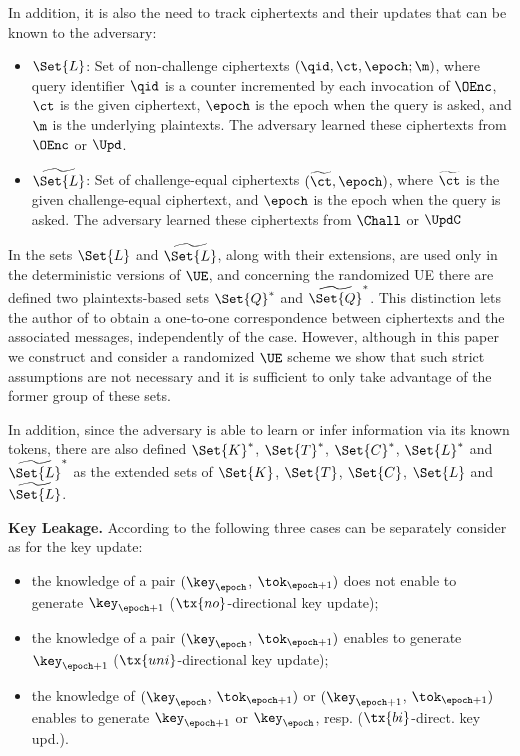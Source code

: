 \documentclass{fundam}
\begin{document}
In addition, it is also the need to track ciphertexts and their updates that can be known to the adversary:
\begin{itemize}
\item $\Set{L}$: Set of non-challenge ciphertexts $(\qid, \ct, \epoch ; \m)$, where query identifier $\qid$ is a counter incremented by each invocation of $\OEnc$, $\ct$ is the given ciphertext, $\epoch$ is the epoch when the query is asked, and $\m$ is the underlying plaintexts. The adversary learned these ciphertexts from $\OEnc$ or $\Upd$.
\item $\widetilde{\Set{L}}$: Set of challenge-equal ciphertexts $(\widetilde{\ct}, \epoch)$, where $\widetilde{\ct}$ is the given challenge-equal ciphertext, and $\epoch$ is the epoch when the query is asked. The adversary learned these ciphertexts from $\Chall$ or $\UpdC$
\end{itemize} 


In \cite{jiang2020} the sets $\Set{L}$ and $\widetilde{\Set{L}}$, along with their extensions, are used only in the deterministic versions of $\UE$, and concerning the randomized UE there are defined two plaintexts-based sets $\Set{Q}^{*}$ and $\widetilde{\Set{Q}}^{*}$. 
This distinction lets the author of \cite{jiang2020} to obtain a one-to-one correspondence between ciphertexts and the associated messages, independently of the case. 
However, although in this paper we construct and consider a randomized $\UE$ scheme we show that such strict assumptions are not necessary and it is sufficient to only take advantage of the former group of these sets.


In addition, since the adversary is able to learn or infer information via its known tokens, there are also defined $\Set{K}^{*}$, $\Set{T}^{*}$, $\Set{C}^{*}$, $\Set{L}^{*}$ and $\widetilde{\Set{L}}^{*}$ as the extended sets of $\Set{K}$, $\Set{T}$, $\Set{C}$, $\Set{L}$ and $\widetilde{\Set{L}}$.

\vspace{0.1cm}
\noindent\textbf{Key Leakage.} According to \cite{jiang2020} the following three cases can be separately consider as for the key update:
\begin{itemize}
\item  the knowledge of a pair $(\key_{\epoch}$, $\tok_{\epoch+1})$ does not enable to generate $\key_{\epoch+1}$ ($\tx{no}$-directional key update);
\item the knowledge of a pair $(\key_{\epoch}$, $\tok_{\epoch+1})$ enables to generate $\key_{\epoch+1}$ ($\tx{uni}$-directional key update);
\item the knowledge of $(\key_{\epoch}$, $\tok_{\epoch+1})$ or $(\key_{\epoch+1}$, $\tok_{\epoch+1})$ enables to generate $\key_{\epoch+1}$ or $\key_{\epoch}$, resp. ($\tx{bi}$-direct. key upd.).
\end{itemize}
\end{document}

